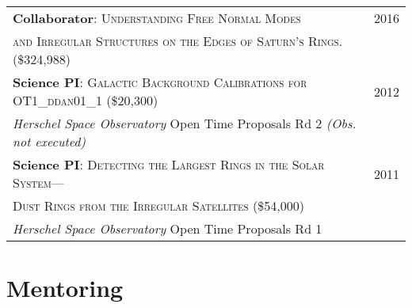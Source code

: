 \documentclass[10pt]{article} %
\begin{document}
\begin{tabular}{l>{\hfill}p{2.3cm}}
{\bf Collaborator}: \textsc{Understanding Free Normal Modes} & 2016 \\
\textsc{ and Irregular Structures on the Edges of Saturn's Rings.} \footnotesize(\$324,988)\normalsize \\
{\bf Science PI}: \textsc{Galactic Background Calibrations for OT1\_ddan01\_1} \footnotesize(\$20,300)\normalsize & 2012 \\
{\it Herschel Space Observatory} Open Time Proposals Rd 2 {\it (Obs. not executed)} \\ 
{\bf Science PI}: \textsc{Detecting the Largest Rings in the Solar System---} & 2011 \\ 
\textsc{Dust Rings from the Irregular Satellites} \footnotesize(\$54,000)\normalsize \\
{\it Herschel Space Observatory} Open Time Proposals Rd 1 \\
\end{tabular}


\section{Mentoring}
\end{document}

